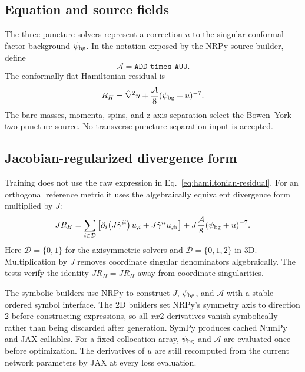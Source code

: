 \documentclass[11pt]{article}
\newcommand{\code}[1]{\texttt{\detokenize{#1}}}
\newcommand{\JRH}{J R_H}
\begin{document}
\subsection{Equation and source fields}

The three puncture solvers represent a correction $u$ to the singular
conformal-factor background $\psi_{\rm bg}$.  In the notation exposed by the
NRPy source builder, define
\begin{equation}
 \mathcal{A}=\texttt{ADD\_times\_AUU}.
\end{equation}
The conformally flat Hamiltonian residual is
\begin{equation}
 R_H=\hat\nabla^2u+
 \frac{\mathcal{A}}{8}(\psi_{\rm bg}+u)^{-7}.
 \label{eq:hamiltonian-residual}
\end{equation}
The bare masses, momenta, spins, and z-axis separation \code{zPunc} select the
Bowen--York two-puncture source.  No transverse puncture-separation input is
accepted.

\subsection{Jacobian-regularized divergence form}

Training does not use the raw expression in
Eq.~\eqref{eq:hamiltonian-residual}.  For an orthogonal reference metric it
uses the algebraically equivalent divergence form multiplied by $J$:
\begin{equation}
 \JRH=
 \sum_{i\in\mathcal{D}}
 \left[
   \partial_i\!\left(J\hat\gamma^{ii}\right)u_{,i}
   +J\hat\gamma^{ii}u_{,ii}
 \right]
 +J\frac{\mathcal{A}}{8}(\psi_{\rm bg}+u)^{-7}.
 \label{eq:jrh}
\end{equation}
Here $\mathcal{D}=\{0,1\}$ for the axisymmetric solvers and
$\mathcal{D}=\{0,1,2\}$ in 3D.  Multiplication by $J$ removes coordinate
singular denominators algebraically.  The tests verify the identity
$\JRH=J R_H$ away from coordinate singularities.

The symbolic builders use NRPy to construct $J$, $\psi_{\rm bg}$, and
$\mathcal{A}$ with a stable ordered symbol interface.  The 2D builders set
NRPy's symmetry axis to direction 2 before constructing expressions, so all
$xx2$ derivatives vanish symbolically rather than being discarded after
generation.  SymPy \code{lambdify} produces cached NumPy and JAX callables.
For a fixed collocation array, $\psi_{\rm bg}$ and $\mathcal{A}$ are evaluated
once before optimization.  The derivatives of $u$ are still recomputed from
the current network parameters by JAX at every loss evaluation.
\end{document}
